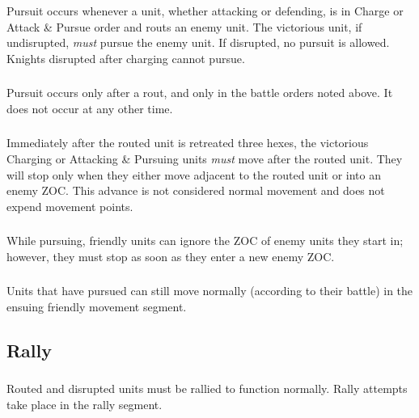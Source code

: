 \subsubsection[When Pursuit Occurs]{} Pursuit occurs whenever a unit, whether attacking or defending, is in Charge or Attack \& Pursue order and routs an enemy unit. The victorious unit, if undisrupted, \textit{must} pursue the enemy unit. If disrupted, no pursuit is allowed. Knights disrupted after charging cannot pursue.

\subsubsection[After Rout]{} Pursuit occurs only after a rout, and only in the battle orders noted above. It does not occur at any other time.

\subsubsection[When Pursuit Stops]{} Immediately after the routed unit is retreated three hexes, the victorious Charging or Attacking \& Pursuing units \textit{must} move after the routed unit. They will stop only when they either move adjacent to the routed unit or into an enemy ZOC. This advance is not considered normal movement and does not expend movement points.

\subsubsection[Enemy ZOCs]{} While pursuing, friendly units can ignore the ZOC of enemy units they start in; however, they must stop as soon as they enter a new enemy ZOC.

\subsubsection[Followup Movement]{} Units that have pursued can still move normally (according to their battle) in the ensuing friendly movement segment.

\subsection{Rally}

\subsubsection[When Rally Happens]{} Routed and disrupted units must be rallied to function normally. Rally attempts take place in the rally segment.

